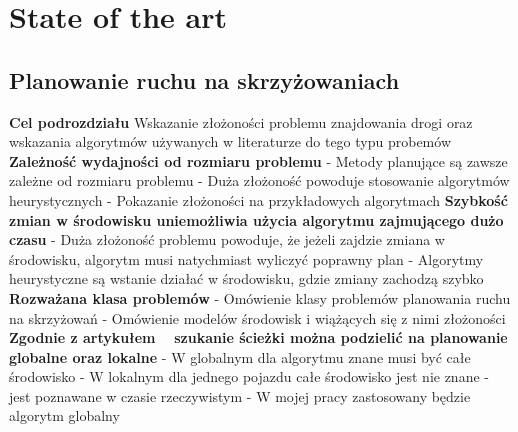 \chapter{State of the art} \label{chap:state-of-the-art}

\section{Planowanie ruchu na skrzyżowaniach}

\textbf{Cel podrozdziału}
\newline
Wskazanie złożoności problemu znajdowania drogi oraz wskazania algorytmów używanych w literaturze do tego typu probemów
\newline
\newline
\textbf{Zależność wydajności od rozmiaru problemu}
\newline
- Metody planujące są zawsze zależne od rozmiaru problemu
\newline
- Duża złożoność powoduje stosowanie algorytmów heurystycznych
\newline
- Pokazanie złożoności na przykładowych algorytmach
\newline
\newline
\textbf{Szybkość zmian w środowisku uniemożliwia użycia algorytmu zajmującego dużo czasu}
\newline
- Duża złożoność problemu powoduje, że jeżeli zajdzie zmiana w środowisku, algorytm musi natychmiast wyliczyć poprawny plan
\newline
- Algorytmy heurystyczne są wstanie działać w środowisku, gdzie zmiany zachodzą szybko
\newline
\newline
\textbf{Rozważana klasa problemów}
\newline
- Omówienie klasy problemów planowania ruchu na skrzyżowań
\newline
- Omówienie modelów środowisk i wiążących się z nimi złożoności
\newline
\newline
\textbf{Zgodnie z artykułem ~\cite{leena2014survey} szukanie ścieżki można podzielić na planowanie globalne oraz lokalne}
\newline
- W globalnym dla algorytmu znane musi być całe środowisko
\newline
- W lokalnym dla jednego pojazdu całe środowisko jest nie znane - jest poznawane w czasie rzeczywistym
\newline
- W mojej pracy zastosowany będzie algorytm globalny
\newline
\newline

